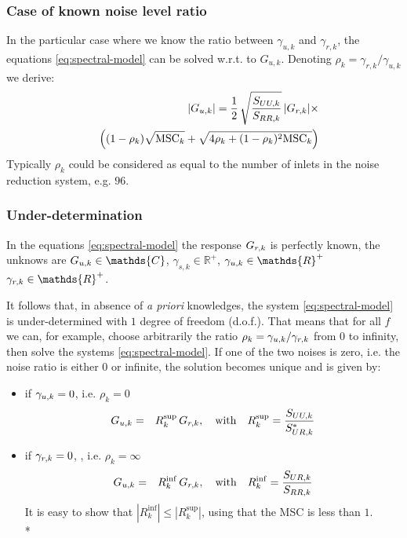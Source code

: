 \subsubsection{Case of known noise level ratio}
In the particular case where we know the ratio between $\gamma_{u,k}$ and  $\gamma_{r,k}$, the equations \eqref{eq:spectral-model} can be solved w.r.t. to $G_{u,k}$. Denoting $\rho_{k}=\gamma_{r,k}/\gamma_{u,k}$ we derive:
\begin{eqnarray}
\label{eq:known-noise-ratio}
&&\hspace{-1cm}|G_{\ut,k}|=
\frac{1}{2}\,\sqrt{\frac{S_{UU,k}}{S_{RR,k}}}\,|G_{\rf, k}|\times 
\\&&\nonumber
\left(
(1-\rho_{k})\sqrt{\MSC_{k}}+\sqrt{4\rho_{k}+(1-\rho_{k})^{2}\MSC_{k}}
\right)
\end{eqnarray}
Typically $\rho_{k}$ could be considered as equal to the number of inlets in the noise reduction system, e.g. $96$.




\subsubsection{Under-determination}
In the equations \eqref{eq:spectral-model} the response $G_{{r},k}$ is perfectly known, the unknows are $G_{\ut,k}\in\mathds{C}$, $\gamma_{s,k}\in\mathds{R}^{+}$,  $\gamma_{\ut,k}\in\mathds{R}^{+}$
$\gamma_{\rf,k}\in\mathds{R}^{+}$. 
 
It follows that, in absence of {\it a priori} knowledges,  the system \eqref{eq:spectral-model} is under-determined with $1$ degree of freedom (d.o.f.). That means that for all $f$ we can, for example,  choose arbitrarily the ratio $\rho_{k}=\gamma_{{u},k}/\gamma_{{r},k}$ from $0$ to infinity, then solve the systems \eqref{eq:spectral-model}. If one of the two noises is zero, i.e. the noise ratio is either 0 or infinite, the solution becomes unique and is given by:





\begin{itemize}
\item
if $\gamma_{{u},k}=0$, i.e. $\rho_{k}=0$
\begin{eqnarray}
\label{eq:ratio-sup-bis-exact}
{G_{{u},k}}&=&R_{k}^{\sup}\,G_{{r},k}, \quad \mathrm{with}\quad
R_{k}^{\sup} = \frac{{S_{UU,k}}}{{S^*_{UR,k}}}
\end{eqnarray}
\item
if $\gamma_{{r},k}=0$, , i.e. $\rho_{k}=\infty$
\begin{eqnarray}
\label{eq:ratio-inf-bis-exact}
{G_{{u},k}}&=&R_{k}^{\inf}\,G_{{r},k}, \quad \mathrm{with}\quad
R_{k}^{\inf}=\frac{{S_{UR,k}}}{{S_{RR,k}}}
\end{eqnarray}
It is easy to show that $|R_{k}^{\inf}|\leq |R_{k}^{\sup}|$, using that the MSC is less than $1$.\\*
\end{itemize}

